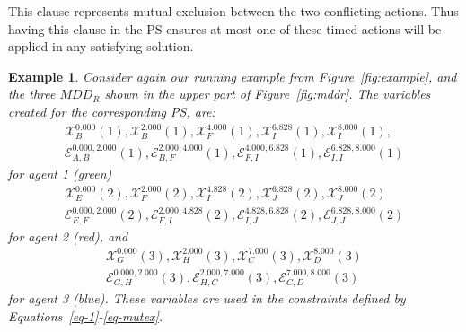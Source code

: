 \documentclass[review]{elsarticle}
\newtheorem{example}{Example}
\newcommand{\mddr}{\ensuremath{MDD_R}\xspace}
\newcommand\konstantin[1]{\nb{\textbf{Konstantin:}}{red}{#1}}
\newcommand\roni[1]{\nb{\textbf{Roni:}}{green}{#1}}
\newcommand\pavel[1]{\nb{\textbf{Pavel:}}{blue}{#1}}
\newcommand{\ps}{\ac{PS}\xspace}
\begin{document}
This clause represents mutual exclusion between the two conflicting actions. 
Thus having this clause in the \ps ensures at most one of these timed actions will be applied in any satisfying solution. 

\begin{example}
Consider again our running example from Figure~\ref{fig:example}, 
and the three \mddr shown in the upper part of Figure~\ref{fig:mddr}. 
The variables created for the corresponding \ps , are:
\begin{multline*}
\mathcal{X}_B^{0.000}(1), \mathcal{X}_B^{2.000}(1), \mathcal{X}_F^{4.000}(1), \mathcal{X}_I^{6.828}(1), \mathcal{X}_I^{8.000}(1), \\
\mathcal{E}_{A,B}^{0.000,2.000}(1), \mathcal{E}_{B,F}^{2.000,4.000}(1), \mathcal{E}_{F,I}^{4.000,6.828}(1), \mathcal{E}_{I,I}^{6.828,8.000}(1)    
\end{multline*}
for agent 1 (green)
\begin{multline*}
    \mathcal{X}_E^{0.000}(2), \mathcal{X}_F^{2.000}(2), \mathcal{X}_I^{4.828}(2), \mathcal{X}_J^{6.828}(2), \mathcal{X}_J^{8.000}(2)\\
\mathcal{E}_{E,F}^{0.000,2.000}(2), \mathcal{E}_{F,I}^{2.000,4.828}(2), \mathcal{E}_{I,J}^{4.828,6.828}(2), \mathcal{E}_{J,J}^{6.828,8.000}(2)
\end{multline*}    
for agent 2 (red), and 
\begin{multline*}
    \mathcal{X}_G^{0.000}(3), \mathcal{X}_H^{2.000}(3), \mathcal{X}_C^{7.000}(3), \mathcal{X}_D^{8.000}(3) \\
\mathcal{E}_{G,H}^{0.000,2.000}(3), \mathcal{E}_{H,C}^{2.000,7.000}(3), \mathcal{E}_{C,D}^{7.000,8.000}(3)
\end{multline*}
for agent 3 (blue). 
These variables are used in the constraints defined by Equations~\ref{eq-1}-\ref{eq-mutex}. 

\end{example}
\end{document}
